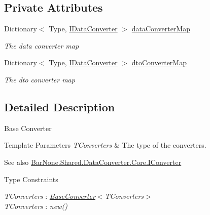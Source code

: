 \subsection*{Private Attributes}
\begin{DoxyCompactItemize}
\item 
Dictionary$<$ Type, \mbox{\hyperlink{interface_bar_none_1_1_shared_1_1_data_converter_1_1_core_1_1_i_data_converter}{I\+Data\+Converter}} $>$ \mbox{\hyperlink{class_bar_none_1_1_shared_1_1_data_converter_1_1_core_1_1_base_converter_a93a6cac2afcb2b933670a222f8c0349d}{data\+Converter\+Map}}
\begin{DoxyCompactList}\small\item\em The data converter map \end{DoxyCompactList}\item 
Dictionary$<$ Type, \mbox{\hyperlink{interface_bar_none_1_1_shared_1_1_data_converter_1_1_core_1_1_i_data_converter}{I\+Data\+Converter}} $>$ \mbox{\hyperlink{class_bar_none_1_1_shared_1_1_data_converter_1_1_core_1_1_base_converter_af3bc02b8dae539fdfabf1d1e3b12c16c}{dto\+Converter\+Map}}
\begin{DoxyCompactList}\small\item\em The dto converter map \end{DoxyCompactList}\end{DoxyCompactItemize}


\subsection{Detailed Description}
Base Converter 


\begin{DoxyTemplParams}{Template Parameters}
{\em T\+Converters} & The type of the converters.\\
\hline
\end{DoxyTemplParams}
\begin{DoxySeeAlso}{See also}
\mbox{\hyperlink{interface_bar_none_1_1_shared_1_1_data_converter_1_1_core_1_1_i_converter}{Bar\+None.\+Shared.\+Data\+Converter.\+Core.\+I\+Converter}}


\end{DoxySeeAlso}
\begin{Desc}
\item[Type Constraints]\begin{description}
\item[{\em T\+Converters} : {\em \mbox{\hyperlink{class_bar_none_1_1_shared_1_1_data_converter_1_1_core_1_1_base_converter}{Base\+Converter}}$<$T\+Converters$>$}]\item[{\em T\+Converters} : {\em new()}]\end{description}
\end{Desc}


